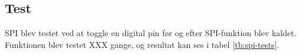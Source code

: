 




\subsection{Test} 






SPI blev testet ved at toggle en digital pin før og efter SPI-funktion blev kaldet. 
Funktionen blev testet XXX gange, og resultat kan ses i tabel \ref{tb:spi-tests}. 

